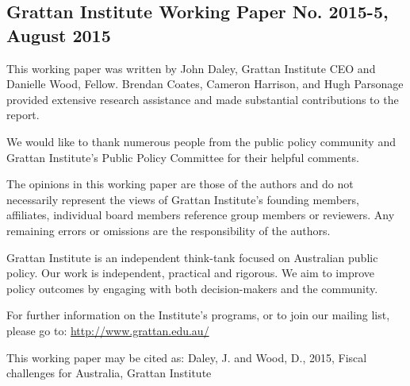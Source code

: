 \subsection*{Grattan Institute Working Paper No. 2015-5, August 2015}
This working paper was written by John Daley, Grattan Institute CEO and
Danielle Wood, Fellow. Brendan Coates, Cameron Harrison, and Hugh
Parsonage provided extensive research assistance and made substantial
contributions to the report. 

We would like to thank numerous people from the public policy community and
Grattan Institute's Public Policy Committee for their helpful comments.

The opinions in this working paper are those of the authors and do not
necessarily represent the views of Grattan Institute's founding members,
affiliates, individual board members reference group members or reviewers. Any
remaining errors or omissions are the responsibility of the authors.

Grattan Institute is an independent think-tank focused on Australian public
policy. Our work is independent, practical and rigorous. We aim to improve
policy outcomes by engaging with both decision-makers and the community. 

For further information on the Institute's programs, or to join our mailing list,
please go to: \url{http://www.grattan.edu.au/}

{\small
This working paper may be cited as: Daley, J. and Wood, D., 2015, Fiscal challenges for Australia, Grattan Institute 
}